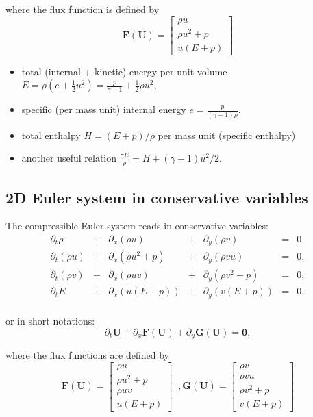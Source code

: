 \documentclass{article}
\begin{document}
where the flux function is defined by
\begin{equation}
  \mathbf{F(U)} = \left [
  \begin{array}{c}
    \rho u \\
    \rho u^2 + p \\
    u (E + p)
  \end{array} \right]
\end{equation}

\begin{itemize}
\item total (internal + kinetic) energy per unit volume $E = \rho \left( e + \frac{1}{2} u^2 \right) = \frac{p}{\gamma-1} + \frac{1}{2} \rho u^2$,
\item specific (per mass unit) internal energy $e=\frac{p}{(\gamma-1)\rho}$.
\item total enthalpy $H = (E + p)/\rho$ per mass unit (specific enthalpy)
\item another useful relation $\frac{\gamma E}{\rho}=H+(\gamma-1)u^2/2$.
\end{itemize}


\subsection*{2D Euler system in conservative variables}
The compressible Euler system reads in conservative variables:\\
\begin{equation}
  \begin{array}{ccccccc}
    \partial_t \rho & + & \partial_x(\rho u) & + & \partial_y(\rho v) & = & 0,\\
    \partial_t (\rho u) & + & \partial_x(\rho u^2+p) & + & \partial_y(\rho v u) & = & 0,\\
    \partial_t (\rho v) & + & \partial_x(\rho u v) & + & \partial_y(\rho v^2+p) & = & 0,\\
    \partial_t E & + & \partial_x (u(E+p)) & + & \partial_y (v(E+p)) & = & 0,\\
  \end{array}
\end{equation}

or in short notations:
\begin{equation*}
  \partial_t \mathbf{U} + \partial_x \mathbf{F(U)} + \partial_y \mathbf{G(U)} = \mathbf{0},
\end{equation*}

where the flux functions are defined by
\begin{equation}
  \mathbf{F(U)} = \left [
  \begin{array}{c}
    \rho u \\
    \rho u^2 + p \\
    \rho u v \\
    u (E + p)
  \end{array} \right]
  \;\; ,
  \mathbf{G(U)} = \left [
  \begin{array}{c}
    \rho v \\
    \rho v u \\
    \rho v^2 + p \\
    v (E + p)
  \end{array} \right]
\end{equation}
\end{document}
